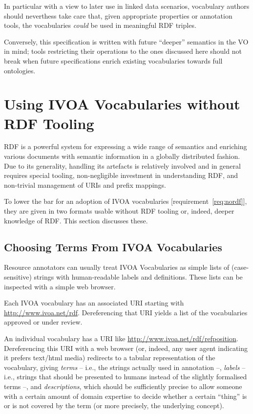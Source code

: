 \documentclass[11pt,a4paper]{ivoa}
\begin{document}
In particular with a view to later use in linked data scenarios,
vocabulary authors should neverthess take care that, given appropriate
properties or annotation tools, the vocabularies \emph{could} be used in
meaningful RDF triples.

Conversely, this specification is written with future ``deeper''
semantics in the VO in mind; tools restricting their operations to the ones
discussed here should not break when future specifications enrich
existing vocabularies towards full ontologies.


\section{Using IVOA Vocabularies without RDF Tooling}
\label{sect:withoutrdf}

RDF is a
powerful system for expressing a wide range of semantics and enriching
various documents with semantic information in a globally distributed
fashion.  Due to its generality, handling its artefacts is relatively
involved and in general requires special tooling, non-negligible
investment in understanding RDF, and non-trivial management of URIs and
prefix mappings.

To lower the bar for an adoption of IVOA vocabularies
[requirement~\ref{req:nordf}], they are given in
two formats usable without RDF tooling or, indeed, deeper knowledge of
RDF.  This section discusses these.

\subsection{Choosing Terms From IVOA Vocabularies}

Resource annotators can usually treat IVOA Vocabularies as simple lists
of (case-sensitive) strings with human-readable labels and definitions.  
These lists can be inspected with a simple web browser.

Each IVOA vocabulary has an associated URI starting with
\url{http://www.ivoa.net/rdf}.  Dereferencing that URI yields a list of
the vocabularies approved or under review.  

An individual vocabulary has a
URI like \url{http://www.ivoa.net/rdf/refposition}.  Dereferencing this URI
with a web browser (or, indeed, any user agent indicating it prefers
text/html media) redirects to a tabular representation of the vocabulary,
giving \emph{terms} -- i.e., the strings actually used in annotation --,
\emph{labels} -- i.e., strings that should be presented to humans instead of
the slightly formalised terms --, and \emph{descriptions}, which should
be sufficiently precise to allow someone with a certain amount
of domain expertise to decide whether a certain ``thing'' is or is not
covered by the term (or more precisely, the underlying concept).
\end{document}

